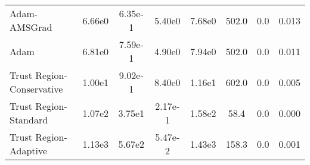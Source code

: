 \documentclass{article}
\begin{document}
\begin{table}[htbp]
{\begin{tabular}{l*{7}{S[table-format=2.2e-1]}}
Adam-AMSGrad & 6.66e0 & 6.35e-1 & 5.40e0 & 7.68e0 & 502.0 & 0.0 & 0.013 \\
Adam & 6.81e0 & 7.59e-1 & 4.90e0 & 7.94e0 & 502.0 & 0.0 & 0.011 \\
Trust Region-Conservative & 1.00e1 & 9.02e-1 & 8.40e0 & 1.16e1 & 602.0 & 0.0 & 0.005 \\
Trust Region-Standard & 1.07e2 & 3.75e1 & 2.17e-1 & 1.58e2 & 58.4 & 0.0 & 0.000 \\
Trust Region-Adaptive & 1.13e3 & 5.67e2 & 5.47e-2 & 1.43e3 & 158.3 & 0.0 & 0.001 \\
\bottomrule
\end{tabular}
}
\end{table}
\end{document}
